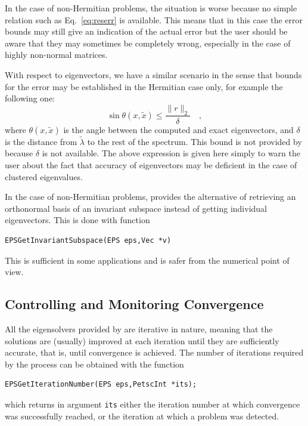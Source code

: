 	In the case of non-Hermitian problems, the situation is worse because no simple relation such as Eq.\ \ref{eq:reserr} is available. This means that in this case the error bounds may still give an indication of the actual error but the user should be aware that they may sometimes be completely wrong, especially in the case of highly non-normal matrices.

	With respect to eigenvectors, we have a similar scenario in the sense that bounds for the error may be established in the Hermitian case only, for example the following one:
\begin{equation}
\sin \theta(x,\tilde{x})\leq \frac{\|r\|_2}{\delta}\quad,
\end{equation}
where $\theta(x,\tilde{x})$ is the angle between the computed and exact eigenvectors, and $\delta$ is the distance from $\tilde{\lambda}$ to the rest of the spectrum. This bound is not provided by \slepc because $\delta$ is not available. The above expression is given here simply to warn the user about the fact that accuracy of eigenvectors may be deficient in the case of clustered eigenvalues.

	In the case of non-Hermitian problems, \slepc provides the alternative of retrieving an orthonormal basis of an invariant subspace instead of getting individual eigenvectors. This is done with function
	\begin{Verbatim}[fontsize=\small]
	EPSGetInvariantSubspace(EPS eps,Vec *v)
	\end{Verbatim}
This is sufficient in some applications and is safer from the numerical point of view.

\subsection{Controlling and Monitoring Convergence}
\label{sec:monitor}

	All the eigensolvers provided by \slepc are iterative in nature, meaning that the solutions are (usually) improved at each iteration until they are sufficiently accurate, that is, until convergence is achieved. The number of iterations required by the process can be obtained with the function%
	\begin{Verbatim}[fontsize=\small]
        EPSGetIterationNumber(EPS eps,PetscInt *its);
	\end{Verbatim}
which returns in argument \texttt{its} either the iteration number at which convergence was successfully reached, or the iteration at which a problem was detected. 

